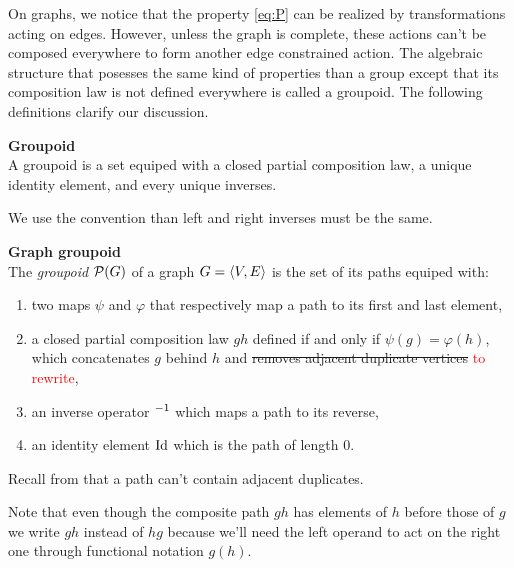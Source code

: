 
On graphs, we notice that the property \eqref{eq:P} can be realized by transformations acting on edges. However, unless the graph is complete, these actions can't be composed everywhere to form another edge constrained action. The algebraic structure that posesses the same kind of properties than a group except that its composition law is not defined everywhere is called a groupoid. The following definitions clarify our discussion.

\begin{definition}\textbf{Groupoid}\\
A groupoid is a set equiped with a closed partial composition law, a unique identity element, and every unique inverses.
\end{definition}

\begin{remark}We use the convention than left and right inverses must be the same.
\end{remark}

\begin{definition}\textbf{Graph groupoid}\\
The \emph{groupoid} $\cp(G)$ of a graph $\gve$ is the set of its paths equiped with:
\begin{enumerate}
\item two maps $\psi$ and $\varphi$ that respectively map a path to its first and last element,
\item a closed partial composition law $gh$ defined if and only if $\psi(g) = \varphi(h)$, which concatenates $g$ behind $h$ and \sout{removes adjacent duplicate vertices} \textcolor{red}{to rewrite},
\item an inverse operator $\h{0}^{-1}$ which maps a path to its reverse,
\item an identity element $\id$ which is the path of length $0$.
\end{enumerate}
\end{definition}

\begin{remark}Recall from  that a path can't contain adjacent duplicates.
\end{remark}

\begin{remark}Note that even though the composite path $gh$ has elements of $h$ before those of $g$ we write $gh$ instead of $hg$ because we'll need the left operand to act on the right one through functional notation $g(h)$.
\end{remark}

